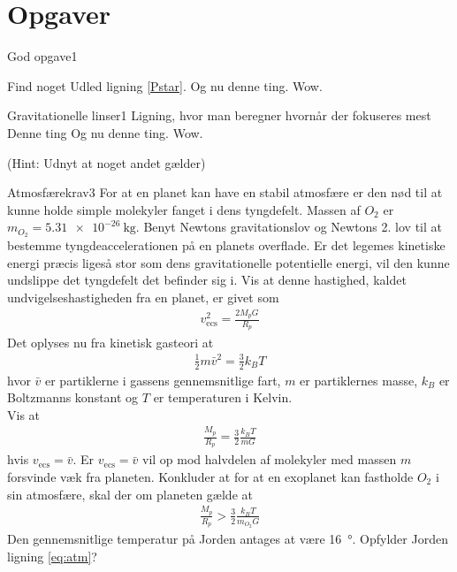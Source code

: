\section{Opgaver}
\begin{opgave}{God opgave}{1}

Find noget
\opg Udled ligning \ref{Pstar}.
\opg Og nu denne ting. Wow.
\end{opgave}


\begin{opgave}{Gravitationelle linser}{1}
Ligning, hvor man beregner hvornår der fokuseres mest
\opg Denne ting
\opg Og nu denne ting. Wow.

(Hint: Udnyt at noget andet gælder)
\end{opgave}

\begin{opgave}{Atmosfærekrav}{3}
For at en planet kan have en stabil atmosfære er den nød til at kunne holde simple molekyler fanget i dens tyngdefelt. Massen af $O_2$ er $m_{O_2} = \SI{5,31e-26}{\kilo\gram}$.
\opg Benyt Newtons gravitationslov og Newtons 2. lov til at bestemme tyngdeaccelerationen på en planets overflade.
\opg Er det legemes kinetiske energi præcis ligeså stor som dens gravitationelle potentielle energi, vil den kunne undslippe det tyngdefelt det befinder sig i. Vis at denne hastighed, kaldet undvigelseshastigheden fra en planet, er givet som
\begin{align*}
	v_\mathrm{ecs}^2 = \frac{2M_pG}{R_p}
\end{align*}
\opg Det oplyses nu fra kinetisk gasteori at
\begin{align*}
	\frac{1}{2}m\bar{v}^2 = \frac{3}{2}k_BT
\end{align*}
hvor $\bar{v}$ er partiklerne i gassens gennemsnitlige fart, $m$ er partiklernes masse, $k_B$ er Boltzmanns konstant og $T$ er temperaturen i Kelvin. \\
Vis at
\begin{align*}
	\frac{M_p}{R_p} = \frac{3}{2}\frac{k_BT}{mG}
\end{align*}
hvis $v_\mathrm{ecs} = \bar{v}$.
\opg Er $v_\mathrm{ecs} = \bar{v}$ vil op mod halvdelen af molekyler med massen $m$ forsvinde væk fra planeten. Konkluder at for at en exoplanet kan fastholde $O_2$ i sin atmosfære, skal der om planeten gælde at
\begin{align} \label{eq:atm}
	\frac{M_p}{R_p} > \frac{3}{2}\frac{k_BT}{m_{O_2}G}
\end{align}
\opg Den gennemsnitlige temperatur på Jorden antages at være \SI{16}{\degree}. Opfylder Jorden ligning \ref{eq:atm}?
\end{opgave}

